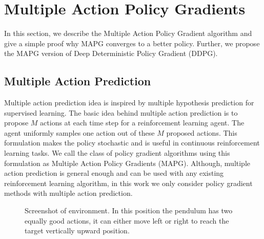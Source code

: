 \chapter{Multiple Action Policy Gradients}\label{chapter:map_algo}
In this section, we describe the Multiple Action Policy Gradient algorithm and give a simple proof why MAPG converges to a better policy. Further, we propose the MAPG version of Deep Deterministic Policy Gradient (DDPG).


\section{Multiple Action Prediction}
Multiple action prediction idea is inspired by multiple hypothesis prediction \cite{rupprecht2017iccv} for supervised learning. The basic idea behind multiple action prediction is to propose $M$ actions at each time step for a reinforcement learning agent. The agent uniformly samples one action out of these $M$ proposed actions. This formulation makes the policy stochastic and is useful in continuous reinforcement learning tasks. We call the class of policy gradient algorithms using this formulation as Multiple Action Policy Gradients (MAPG). Although, multiple action prediction is general enough and can be used with any existing reinforcement learning algorithm, in this work we only consider policy gradient methods with multiple action prediction.

\begin{figure}[htb]
    \centering
    \caption{Screenshot of  environment. In this position the pendulum has two equally good actions, it can either move left or right to reach the target vertically upward position.}
    \label{fig:04_pendulum}
\end{figure}


